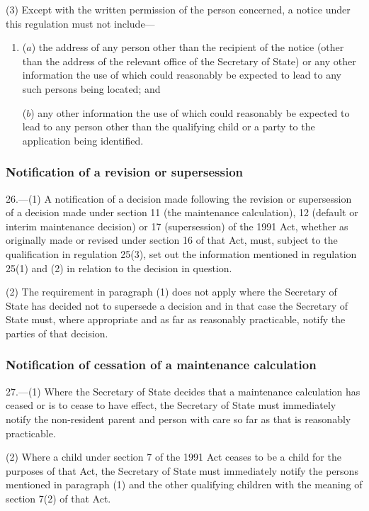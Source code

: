\documentclass[12pt,a4paper]{article}
\begin{document}
(3) Except with the written permission of the person concerned, a notice under this regulation must not include—
\begin{enumerate}\item[]
($a$) the address of any person other than the recipient of the notice (other than the address of the relevant office of the Secretary of State) or any other information the use of which could reasonably be expected to lead to any such persons being located; and

($b$) any other information the use of which could reasonably be expected to lead to any person other than the qualifying child or a party to the application being identified.
\end{enumerate}

\subsubsection[26. Notification of a revision or supersession]{Notification of a revision or supersession}

26.---(1)  A notification of a decision made following the revision or supersession of a decision made under section 11 (the maintenance calculation), 12 (default or interim maintenance decision) or 17 (supersession) of the 1991 Act, whether as originally made or revised under section 16 of that Act, must, subject to the qualification in regulation 25(3), set out the information mentioned in regulation 25(1) and (2) in relation to the decision in question.

(2) The requirement in paragraph (1) does not apply where the Secretary of State has decided not to supersede a decision and in that case the Secretary of State must, where appropriate and as far as reasonably practicable, notify the parties of that decision.

\subsubsection[27. Notification of cessation of a maintenance calculation]{Notification of cessation of a maintenance calculation}

27.---(1)  Where the Secretary of State decides that a maintenance calculation has ceased or is to cease to have effect, the Secretary of State must immediately notify the non-resident parent and person with care so far as that is reasonably practicable.

(2) Where a child under section 7 of the 1991 Act ceases to be a child for the purposes of that Act, the Secretary of State must immediately notify the persons mentioned in paragraph (1) and the other qualifying children with the meaning of section 7(2) of that Act.
\end{document}
